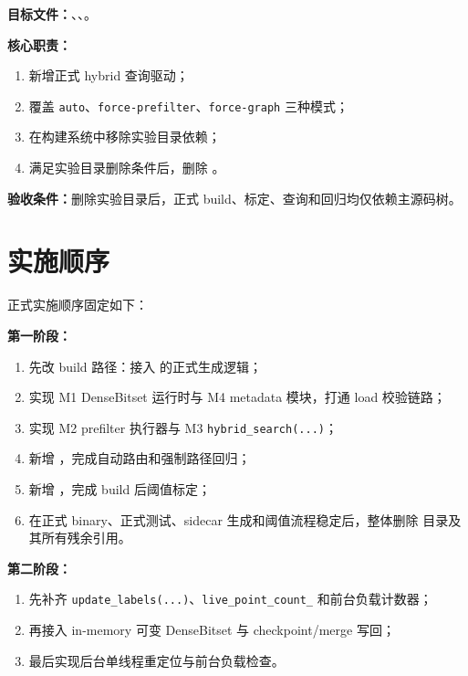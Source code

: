 \documentclass[UTF8]{ctexart}
\begin{document}
\textbf{目标文件：}、、。

\textbf{核心职责：}

\begin{enumerate}
\item 新增正式 hybrid 查询驱动；
\item 覆盖 \texttt{auto}、\texttt{force-prefilter}、\texttt{force-graph} 三种模式；
\item 在构建系统中移除实验目录依赖；
\item 满足实验目录删除条件后，删除 。
\end{enumerate}

\textbf{验收条件：}删除实验目录后，正式 build、标定、查询和回归均仅依赖主源码树。

\section{实施顺序}
正式实施顺序固定如下：

\textbf{第一阶段：}

\begin{enumerate}
\item 先改 build 路径：接入  的正式生成逻辑；
\item 实现 M1 DenseBitset 运行时与 M4 metadata 模块，打通 load 校验链路；
\item 实现 M2 prefilter 执行器与 M3 \texttt{hybrid\_search(...)}；
\item 新增 ，完成自动路由和强制路径回归；
\item 新增 ，完成 build 后阈值标定；
\item 在正式 binary、正式测试、sidecar 生成和阈值流程稳定后，整体删除  目录及其所有残余引用。
\end{enumerate}

\textbf{第二阶段：}

\begin{enumerate}
\item 先补齐 \texttt{update\_labels(...)}、\texttt{live\_point\_count\_} 和前台负载计数器；
\item 再接入 in-memory 可变 DenseBitset 与 checkpoint/merge 写回；
\item 最后实现后台单线程重定位与前台负载检查。
\end{enumerate}
\end{document}
